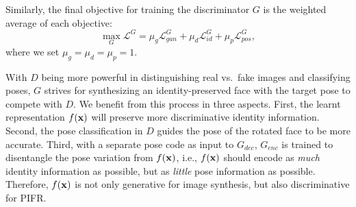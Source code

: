 \documentclass[10pt,journal,compsoc]{IEEEtran}
\begin{document}
Similarly, the final objective for training the discriminator $G$ is the weighted average of each objective:
\begin{equation}
  \max_{G} \mathcal{L}^{G} = \mu_{g} \mathcal{L}_{gan}^{G} + \mu_{d} \mathcal{L}_{id}^{G} +\mu_{p} \mathcal{L}_{pos}^{G},
\label{eqn:objG}
\end{equation}
where we set $\mu_{g} = \mu_{d} = \mu_{p} = 1$.

With $D$ being more powerful in distinguishing real vs.~fake images and classifying poses, $G$ strives for synthesizing an identity-preserved face with the target pose to compete with $D$. %
We benefit from this process in three aspects.
First, the learnt representation $f({\bf{x}})$ will preserve more discriminative identity information. 
Second, the pose classification in $D$ guides the pose of the rotated face to be more accurate. 
Third, with a separate pose code as input to $G_{dec}$, $G_{enc}$ is trained to disentangle the pose variation from $f({\bf{x}})$, i.e., $f({\bf{x}})$ should encode as {\it much} identity information as possible, but as {\it little} pose information as possible.
Therefore, $f({\bf{x}})$ is not only generative for image synthesis, but also discriminative for PIFR. 
\end{document}
